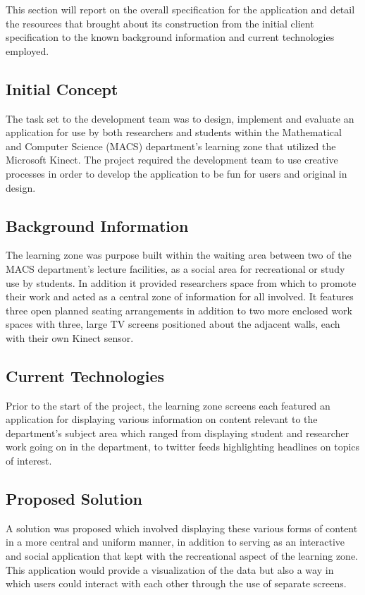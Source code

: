 This section will report on the overall specification for the application and detail the resources that brought about its construction from the initial client specification to the known background information and current technologies employed. 

\subsection{Initial Concept}
The task set to the development team was to design, implement and evaluate an application for use by both researchers and students within the Mathematical and Computer Science (MACS) department's learning zone that utilized the Microsoft Kinect. The project required the development team to use creative processes in order to develop the application to be fun for users and original in design.

\subsection{Background Information}
The learning zone was purpose built within the waiting area between two of the MACS department's lecture facilities, as a social area for recreational or study use by students. In addition it provided researchers space from which to promote their work and acted as a central zone of information for all involved. It features three open planned seating arrangements in addition to two more enclosed work spaces with three, large TV screens positioned about the adjacent walls, each with their own Kinect sensor. 

\subsection{Current Technologies}
Prior to the start of the project, the learning zone screens each featured an application for displaying various information on content relevant to the department's subject area which ranged from displaying student and researcher work going on in the department, to twitter feeds highlighting headlines on topics of interest.

\subsection{Proposed Solution} 
A solution was proposed which involved displaying these various forms of content in a more central and uniform manner, in addition to serving as an interactive and social application that kept with the recreational aspect of the learning zone. This application would provide a visualization of the data but also a way in which users could interact with each other through the use of separate screens.
